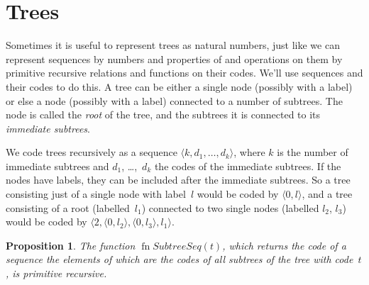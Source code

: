 \documentclass[10pt,a4paper]{article}
\theoremstyle{plain}
\newtheorem{prop}[thm]{Proposition}
\theoremstyle{definition}
\theoremstyle{remark}
\newcommand*{\olfileid}[3]{}
\newcommand*{\olsection}[1]{\section*{#1}}
\newcommand*{\ollabel}[1]{\label{#1}}
\providecommand{\tuple}[1]{\langle #1 \rangle}
\providecommand{\fn}{\operatorname{fn}}
\providecommand{\fn}{\operatorname{fn}}
\begin{document}
\olfileid{cmp}{rec}{tre}
\olsection{Trees}

Sometimes it is useful to represent trees as natural numbers, just
like we can represent sequences by numbers and properties of and
operations on them by primitive recursive relations and functions on
their codes.  We'll use sequences and their codes to do this. A tree
can be either a single node (possibly with a label) or else a node
(possibly with a label) connected to a number of subtrees. The node is
called the \emph{root} of the tree, and the subtrees it is connected
to its \emph{immediate subtrees}.

We code trees recursively as a sequence $\tuple{k, d_1, \dots, d_k}$,
where $k$ is the number of immediate subtrees and $d_1$, \dots,~$d_k$
the codes of the immediate subtrees. If the nodes have labels, they
can be included after the immediate subtrees. So a tree consisting
just of a single node with label~$l$ would be coded by $\tuple{0,l}$,
and a tree consisting of a root (labelled~$l_1$) connected to two
single nodes (labelled $l_2$, $l_3$) would be coded by $\tuple{2,
  \tuple{0, l_2}, \tuple{0, l_3}, l_1}$.

\begin{prop}
  \ollabel{prop:subtreeseq}
  The function $\fn{SubtreeSeq}(t)$, which returns the code of a
  sequence the elements of which are the codes of all subtrees of the
  tree with code~$t$, is primitive recursive.
\end{prop}
\end{document}

